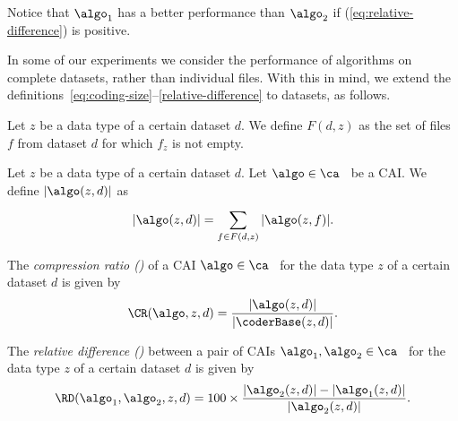 Notice that $\algo_1$ has a better performance than $\algo_2$ if (\ref{eq:relative-difference}) is positive.


\vspace{+3pt}
In some of our experiments we consider the performance of algorithms on complete datasets, rather than individual files. With this in mind, we extend the definitions~\ref{eq:coding-size}--\ref{relative-difference} to datasets, as follows.


\vspace{+5pt}
\begin{defcion}
\label{eq:coding-size-dataset}
Let $z$ be a data type of a certain dataset $d$. We define $F(d, z)$ as the set of files $f$ from dataset $d$ for which $f_z$ is not empty.
\end{defcion}


\begin{defcion}
Let $z$ be a data type of a certain dataset $d$. Let $\algo \in \ca$ \ be a CAI. We define $|\algo(z, d)|$ as
\vspace{-5pt}
\begin{equation}
\label{eq:dataset-size}
|\algo(z, d)|  = \sum_{f \in F(d, z)}^{} |\algo(z, f)|.
\end{equation}
\end{defcion}


\vspace{+3pt}
\begin{defcion}
The \textit{compression ratio (\CRit)} of a CAI $\algo \in \ca$ \ for the data type $z$ of a certain dataset $d$ is given by
\vspace{-5pt}
\begin{equation}
\label{eq:compression-rate-dataset}
\CR(\algo, z, d) = \frac{|\algo(z, d)|}{|\coderBase(z, d)|}.
\end{equation}
\end{defcion}


\vspace{+3pt}
\begin{defcion}
\label{def:relative-difference-dataset}
The \textit{relative difference (\RDit)} between a pair of CAIs $\algo_1, \algo_2 \in {\ca}$ \ for the data type $z$ of a certain dataset $d$ is given by
\vspace{-5pt}
\begin{equation}
\label{eq:relative-difference-dataset}
\RD(\algo_1, \algo_2, z, d)  =
100\times\frac{|\algo_2 (z, d)| - |\algo_1 (z, d)|}{ |\algo_2 (z, d)| }.
\end{equation}
\end{defcion}

